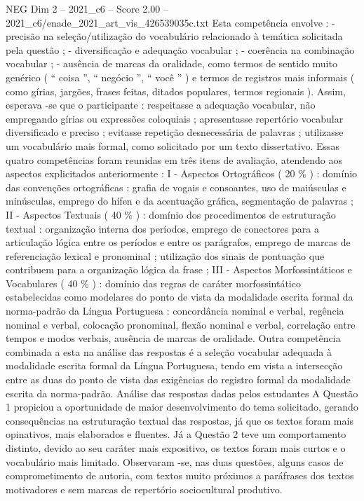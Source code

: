 \begin{textsample}{NEG Dim 2 – 2021\_c6 – Score 2.00 – 2021\_c6/enade\_2021\_art\_vis\_426539035c.txt}
Esta competência envolve : - precisão na seleção/utilização do vocabulário relacionado à temática solicitada pela questão ; - diversificação e adequação vocabular ; - coerência na combinação vocabular ; - ausência de marcas da oralidade, como termos de sentido muito genérico ( “ coisa ”, “ negócio ”, “ você ” ) e termos de registros mais informais ( como gírias, jargões, frases feitas, ditados populares, termos regionais ).
Assim, esperava -se que o participante : respeitasse a adequação vocabular, não empregando gírias ou expressões coloquiais ; apresentasse repertório vocabular diversificado e preciso ; evitasse repetição desnecessária de palavras ; utilizasse um vocabulário mais formal, como solicitado por um texto dissertativo.
Essas quatro competências foram reunidas em três itens de avaliação, atendendo aos aspectos explicitados anteriormente : I - Aspectos Ortográficos ( 20 \% ) : domínio das convenções ortográficas : grafia de vogais e consoantes, uso de maiúsculas e minúsculas, emprego do hífen e da acentuação gráfica, segmentação de palavras ; II - Aspectos Textuais ( 40 \% ) : domínio dos procedimentos de estruturação textual : organização interna dos períodos, emprego de conectores para a articulação lógica entre os períodos e entre os parágrafos, emprego de marcas de referenciação lexical e pronominal ; utilização dos sinais de pontuação que contribuem para a organização lógica da frase ; III - Aspectos Morfossintáticos e Vocabulares ( 40 \% ) : domínio das regras de caráter morfossintático estabelecidas como modelares do ponto de vista da modalidade escrita formal da norma-padrão da Língua Portuguesa : concordância nominal e verbal, regência nominal e verbal, colocação pronominal, flexão nominal e verbal, correlação entre tempos e modos verbais, ausência de marcas de oralidade.
Outra competência combinada a esta na análise das respostas é a seleção vocabular adequada à modalidade escrita formal da Língua Portuguesa, tendo em vista a intersecção entre as duas do ponto de vista das exigências do registro formal da modalidade escrita da norma-padrão.
Análise das respostas dadas pelos estudantes A Questão 1 propiciou a oportunidade de maior desenvolvimento do tema solicitado, gerando consequências na estruturação textual das respostas, já que os textos foram mais opinativos, mais elaborados e fluentes.
Já a Questão 2 teve um comportamento distinto, devido ao seu caráter mais expositivo, os textos foram mais curtos e o vocabulário mais limitado.
Observaram -se, nas duas questões, alguns casos de comprometimento de autoria, com textos muito próximos a paráfrases dos textos motivadores e sem marcas de repertório sociocultural produtivo.

\end{textsample}
